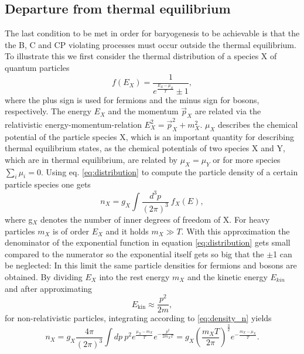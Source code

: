 \subsection{Departure from thermal equilibrium}
\label{sec:equilib}
The last condition to be met in order for baryogenesis to be achievable is that the the B, C and CP violating processes must occur outside the thermal equilibrium. To illustrate this we first consider the thermal distribution of a species X of quantum particles
\begin{equation}
	f(E_X)=\frac{1}{e^{\frac{E_X-\mu_X}{T}}\pm1},
	\label{eq:distribution}
\end{equation}
where the plus sign is used for fermions and the minus sign for bosons, respectively.
The energy $E_X$ and the momentum $\vec{p}_X$ are related via the relativistic energy-momentum-relation $E_X^2=\vec{p}_X^2+m_X^2$. $\mu_X$ describes the chemical potential of the particle species X, which is an important quantity for describing thermal equilibrium states, as the chemical potentials of two species X and Y, which are in thermal equilibrium, are related by $\mu_X=\mu_Y$ or for more species $\sum_i\mu_i=0$.\newline\indent
Using eq. \eqref{eq:distribution} to compute the particle density of a certain particle species one gets 
\begin{equation}
	n_X=g_X\int\frac{d^3p}{(2\pi)^3}\:f_X(E),
	\label{eq:density_n}
\end{equation}
where g$_X$ denotes the number of inner degrees of freedom of X. \newline\indent
For heavy particles $m_X$ is of order $E_X$ and it holds $m_X\gg T$. With this approximation the denominator of the exponential function in equation \eqref{eq:distribution} gets small compared to the numerator so the exponential itself gets so big that the $\pm$1 can be neglected: In this limit the same particle densities for fermions and bosons are obtained. By dividing $E_X$ into the rest energy $m_X$ and the kinetic energy $E_{kin}$ and after approximating
\begin{equation}
	E_{\text{kin}}\approx\frac{p^2}{2m},
\end{equation}
for non-relativistic particles, integrating according to \eqref{eq:density_n} yields
\begin{equation}
n_X=g_X\frac{4\pi}{(2\pi)^3}\int dp\:p^2e^\frac{\mu_X-m_X}{T}e^{-\frac{p^2}{2m_XT}}=g_X\left(\frac{m_XT}{2\pi}\right)^\frac{3}{2}e^{-\frac{m_X-\mu_X}{T}}.
\label{eq:numerX}
\end{equation}

